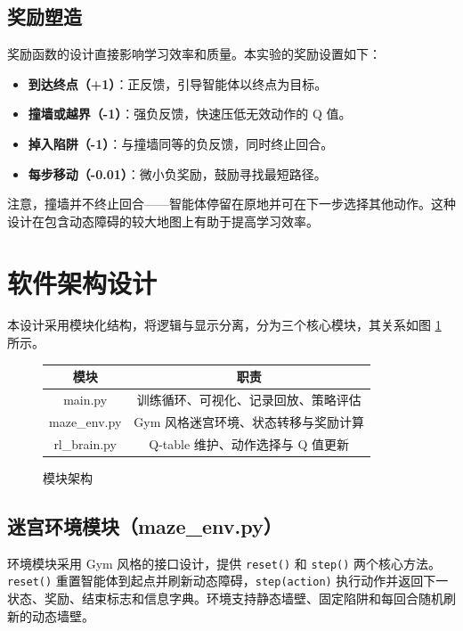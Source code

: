 \documentclass[UTF8,12pt,a4paper]{ctexart}
\begin{document}
\subsection{奖励塑造}
奖励函数的设计直接影响学习效率和质量。本实验的奖励设置如下：
\begin{itemize}
    \item \textbf{到达终点（+1）}：正反馈，引导智能体以终点为目标。
    \item \textbf{撞墙或越界（-1）}：强负反馈，快速压低无效动作的 Q 值。
    \item \textbf{掉入陷阱（-1）}：与撞墙同等的负反馈，同时终止回合。
    \item \textbf{每步移动（-0.01）}：微小负奖励，鼓励寻找最短路径。
\end{itemize}
注意，撞墙并不终止回合——智能体停留在原地并可在下一步选择其他动作。这种设计在包含动态障碍的较大地图上有助于提高学习效率。

\section{软件架构设计}

本设计采用模块化结构，将逻辑与显示分离，分为三个核心模块，其关系如图 \ref{fig:architecture} 所示。

\begin{figure}[H]
    \centering
    \begin{minipage}{0.9\textwidth}
    \centering
    \begin{tabular}{|c|c|}
    \hline
    \textbf{模块} & \textbf{职责} \\
    \hline
    main.py & 训练循环、可视化、记录回放、策略评估 \\
    \hline
    maze\_env.py & Gym 风格迷宫环境、状态转移与奖励计算 \\
    \hline
    rl\_brain.py & Q-table 维护、动作选择与 Q 值更新 \\
    \hline
    \end{tabular}
    \caption{模块架构}
    \label{fig:architecture}
    \end{minipage}
\end{figure}

\subsection{迷宫环境模块（maze\_env.py）}
环境模块采用 Gym 风格的接口设计，提供 \texttt{reset()} 和 \texttt{step()} 两个核心方法。\texttt{reset()} 重置智能体到起点并刷新动态障碍，\texttt{step(action)} 执行动作并返回下一状态、奖励、结束标志和信息字典。环境支持静态墙壁、固定陷阱和每回合随机刷新的动态墙壁。
\end{document}

